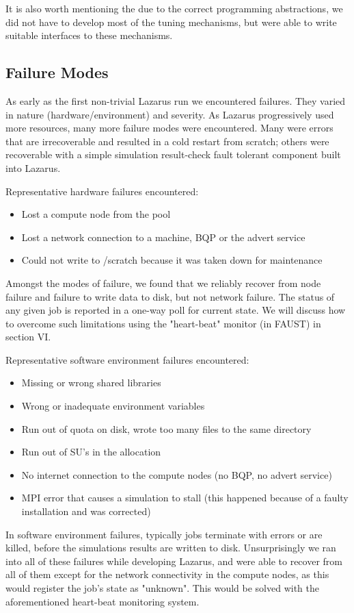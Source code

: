 \documentclass{sig-alternate}
\begin{document}
It is also worth mentioning the due to the correct programming
abstractions, we did not have to develop most of the tuning
mechanisms, but were able to write suitable interfaces to these
mechanisms.


\subsection{Failure Modes}
As early as the first non-trivial Lazarus run we encountered failures. They
varied in nature (hardware/environment) and severity. As Lazarus progressively
used more resources, many more failure modes were encountered.
Many were errors that are irrecoverable and resulted in a
cold restart from scratch; others were recoverable with a simple simulation 
result-check fault tolerant component built into Lazarus.

Representative hardware failures encountered:
\begin{itemize}\addtolength{\itemsep}{-0.8\baselineskip}
\item{Lost a compute node from the pool}
\item{Lost a network connection to a machine, BQP or the advert service}
\item{Could not write to /scratch because it was taken down for maintenance}
\end{itemize}
Amongst the modes of failure, we found that we reliably recover from node failure and failure to write data to disk, but not network failure. The status of any given job is reported in a one-way poll for current state.  We will discuss how to overcome such limitations using the "heart-beat" monitor (in FAUST) in section VI.

Representative software environment failures encountered:
\begin{itemize}\addtolength{\itemsep}{-0.8\baselineskip}
\item{Missing or wrong shared libraries}
\item{Wrong or inadequate environment variables}
\item{Run out of quota on disk, wrote too many files to the same directory}
\item{Run out of SU's in the allocation}
\item{No internet connection to the compute nodes (no BQP, no advert service)}
\item{MPI error that causes a simulation to stall (this happened because of a faulty installation and was corrected)}
\end{itemize}
In software environment failures, typically jobs terminate with errors
or are killed, before the simulations results are written to
disk. Unsurprisingly we ran into all of these failures while
developing Lazarus, and were able to recover from all of them except
for the network connectivity in the compute nodes, as this would
register the job's state as "unknown". This would be solved with the
aforementioned heart-beat monitoring system.
\end{document}
